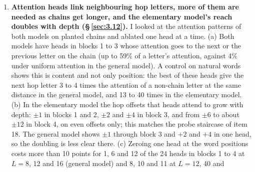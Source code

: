 \documentclass[paper=a4,fontsize=11pt,DIV=11,parskip=half,headings=small,numbers=noendperiod]{scrartcl}
\DeclareRobustCommand{\lead}[1]{\textsf{\bfseries\color{accent}#1}}
\begin{document}
\begin{enumerate}
  a probe for the continuation of a chain is clearly above its layer-0 baseline for $h=1$ at layer 1 (86\%
  against 56\%), $h\le2$ at layer 2, $h\le4$ at layer 3, $h\le8$ at layer 4 (50\% and 45\% at $h=5$–6 and 7–8,
  against 18\% and 15\%), and only partly up to 12 to 16 at layer 5: about 1, 2, 4, 8 and 12 hops at layers 1 to
  5, a doubling pattern like the general model’s (1, 1, 4, 8, 13 or more). Yet this model follows chains of 80
  hops with 99.8\% accuracy (item 11), so a per-position reach of about $2^\ell$ does not by itself cap the hop
  length, and the argument I drew from \S\,\ref{sec:3.9} for a depth limit in the general model is weaker
  (\S\,\ref{sec:5} item 9). Patching agrees with \S\,\ref{sec:3.10} where it can be compared: with a middle or
  last hop corrupted ($L=12$ to 80), restoring all word positions after block 4 brings back the clean answer in
  every word, and with the first hop corrupted the repair works through layer 3 (0.97–1.00) and fails after
  block 4, at every $L$. One difference: restoring only the letters read later also repairs a corrupted first or
  middle hop (0.84 and 0.68 after block 3, $L=40$), which restored nothing in the general model. The probe
  numbers above $h=16$ exist only in planted words and are confounded with position (\S\,\ref{sec:3.11},
  Limits).
\item \lead{Attention heads link neighbouring hop letters, more of them are needed as chains get longer, and the
  elementary model’s reach doubles with depth (\S\,\ref{sec:3.12}).} I looked at the attention patterns of both
  models on planted chains and ablated one head at a time. (a) Both models have heads in blocks 1 to 3 whose
  attention goes to the next or the previous letter on the chain (up to 59\% of a letter’s attention, against
  4\% under uniform attention in the general model). A control on natural words shows this is content and not
  only position: the best of these heads give the next hop letter 3 to 4 times the attention of a non-chain
  letter at the same distance in the general model, and 13 to 40 times in the elementary model. (b) In the
  elementary model the hop offsets that heads attend to grow with depth: $\pm1$ in blocks 1 and 2, $\pm2$ and
  $\pm4$ in block 3, and from $\pm6$ to about $\pm12$ in block 4, on even offsets only; this matches the probe
  staircase of item 18. The general model shows $\pm1$ through block 3 and $+2$ and $+4$ in one head, so the
  doubling is less clear there. (c) Zeroing one head at the word positions costs more than 10 points for 1, 6
  and 12 of the 24 heads in blocks 1 to 4 at $L=8$, 12 and 16 (general model) and 8, 10 and 11 at $L=12$, 40 and

\end{enumerate}
\end{document}
